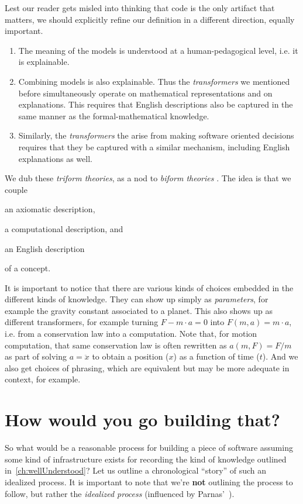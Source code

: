 \documentclass[10pt,twoside,onecolumn,openany,letterpaper]{memoir}
\begin{document}
Lest our reader gets misled into thinking that code is the only artifact
that matters, we should explicitly refine our definition in a different
direction, equally important.
\begin{enumerate}
\item The meaning of the models is understood at a human-pedagogical
level, i.e. it is explainable.
\item Combining models is also explainable. Thus the \emph{transformers}
  we mentioned before %
  simultaneously operate on mathematical representations
and on explanations. This requires that English descriptions also be
captured in the same manner as the formal-mathematical knowledge.
\item Similarly, the \emph{transformers} the arise from making software
oriented decisions requires that they be captured with a similar mechanism,
including English explanations as well.
\end{enumerate}

We dub these \emph{triform theories}, as a nod to \emph{biform theories}%
\cite{Farmer}. The idea is that we couple 
\begin{enumerate*}
\item an axiomatic description,
\item a computational description, and
\item an English description
\end{enumerate*}
of a concept.

It is important to notice that there are various kinds of choices
embedded in the different kinds of knowledge. They can show up simply as
\emph{parameters}, for example the gravity constant associated to a planet.
This also shows up as different transformers, for example turning
$F - m\cdot a = 0$ into $F\left(m, a\right) = m\cdot a$, i.e. from a 
conservation law into a computation. Note that, for motion computation, that
same conservation law is often rewritten as $a\left(m,F\right) = F/m$ as
part of solving $a = \ddot{x}$ to obtain a position ($x$) as a function of time ($t$).
And we also get choices of phrasing, which are equivalent but may be more
adequate in context, for example.

\chapter{How would you go building that?}\label{ch:process}

So what would be a reasonable process for building a piece of software
assuming some kind of infrastructure exists for recording the kind of
knowledge outlined in~\autoref{ch:wellUnderstood}? Let us outline a
chronological ``story'' of such an idealized process.  It is important to
note that we're \textbf{not} outlining the process to follow, but rather
the \emph{idealized process} (influenced by Parnas'~\cite{RationalDesign}).
\end{document}
